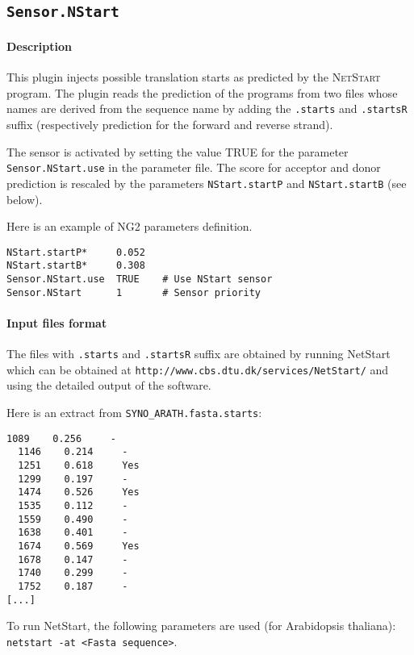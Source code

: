 
\subsection{\texttt{Sensor.NStart}}

\paragraph{Description}

This plugin injects possible translation starts as predicted by the
\textsc{NetStart} program. The plugin reads the prediction of the
programs from two files whose names are derived from the sequence name
by adding the \texttt{.starts} and \texttt{.startsR} suffix
(respectively prediction for the forward and reverse strand).

The sensor is activated by setting the value TRUE for the parameter
\texttt{Sensor.NStart.use} in the parameter file. The score for acceptor
and donor prediction is rescaled by the parameters {\tt NStart.startP} and
{\tt NStart.startB} (see below).

Here is an example of NG2 parameters definition.
\begin{Verbatim}[fontsize=\small]
NStart.startP*     0.052
NStart.startB*     0.308
Sensor.NStart.use  TRUE    # Use NStart sensor
Sensor.NStart      1       # Sensor priority
\end{Verbatim}

\paragraph{Input files format}

The files with \texttt{.starts} and \texttt{.startsR} suffix are
obtained by running NetStart which can be obtained at
\texttt{http://www.cbs.dtu.dk/services/NetStart/} and using the
detailed output of the software.

Here is an extract from \texttt{SYNO\_ARATH.fasta.starts}:
\begin{Verbatim}[fontsize=\small]
  1089    0.256     -
  1146    0.214     -
  1251    0.618     Yes
  1299    0.197     -
  1474    0.526     Yes
  1535    0.112     -
  1559    0.490     -
  1638    0.401     -
  1674    0.569     Yes
  1678    0.147     -
  1740    0.299     -
  1752    0.187     -
[...]
\end{Verbatim}

To run NetStart, the following parameters are used (for Arabidopsis
thaliana): \texttt{netstart -at <Fasta sequence>}.

